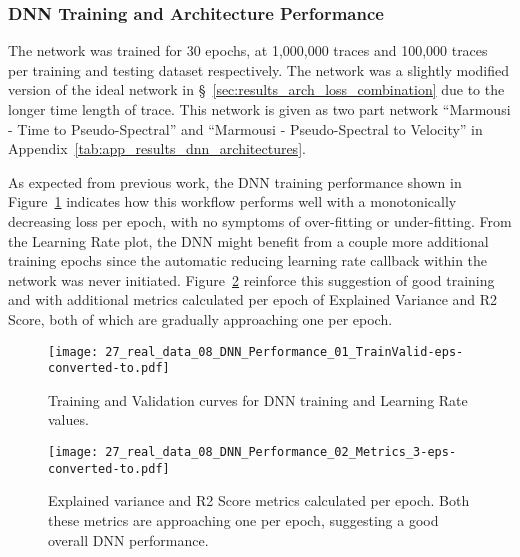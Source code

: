 \subsubsection{DNN Training and Architecture Performance}\label{sec:results_marm_DNN_Training_and_Architecture_Performance}
The network was trained for 30 epochs, at 1,000,000 traces and 100,000 traces per training and testing dataset respectively. The network was a slightly modified version of the ideal network in §~\ref{sec:results_arch_loss_combination} due to the longer time length of trace. This network is given as two part network ``Marmousi - Time to Pseudo-Spectral'' and ``Marmousi - Pseudo-Spectral to Velocity'' in Appendix~\ref{tab:app_results_dnn_architectures}.

As expected from previous work, the DNN training performance shown in Figure~\ref{fig:marm_training_validation_curves} indicates how this workflow performs well with a monotonically decreasing loss per epoch, with no symptoms of over-fitting or under-fitting. From the Learning Rate plot, the DNN might benefit from a couple more additional training epochs since the automatic reducing learning rate callback within the network was never initiated. Figure~\ref{fig:marm_training_validation_metrics} reinforce this suggestion of good training and with additional metrics calculated per epoch of Explained Variance and R2 Score, both of which are gradually approaching one per epoch.
 
\begin{figure}[ht!]
    \centering
    \texttt{[image: 27\_real\_data\_08\_DNN\_Performance\_01\_TrainValid-eps-converted-to.pdf]}
    \caption[Training and Validation curves for DNN training and Learning Rate values.]{Training and Validation curves for DNN training and Learning Rate values.}
    \label{fig:marm_training_validation_curves}
\end{figure}

\begin{figure}[ht!]
    \centering
    \texttt{[image: 27\_real\_data\_08\_DNN\_Performance\_02\_Metrics\_3-eps-converted-to.pdf]}
    \caption[Explained variance and R2 Score metrics calculated per epoch.]{Explained variance and R2 Score metrics calculated per epoch. Both these metrics are approaching one per epoch, suggesting a good overall DNN performance.}
    \label{fig:marm_training_validation_metrics}
\end{figure}

